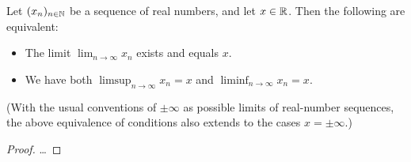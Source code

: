 \begin{lemma}
  \label{lem:limit_with_limsup_liminf}
  Let $(x_n)_{n \in \mathbb{N}}$ be a sequence of real numbers, and let $x \in \mathbb{R}$.
  Then the following are equivalent:
  \begin{itemize}
    \item The limit $\lim_{n \to \infty} x_n$ exists and equals $x$.
    \item We have both $\limsup_{n \to \infty} x_n = x$ and
      $\liminf_{n \to \infty} x_n = x$.
  \end{itemize}

  (With the usual conventions of $\pm\infty$ as possible limits of real-number sequences,
  the above equivalence of conditions also extends to the cases $x = \pm \infty$.)
\end{lemma}
\begin{proof}
  \ldots
\end{proof}
